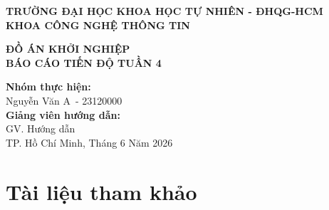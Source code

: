 \documentclass[12pt,a4paper]{article}
\newcommand{\weeknumber}{4}
\newcommand{\reporttitle}{BÁO CÁO TIẾN ĐỘ TUẦN \weeknumber}
\newcommand{\subject}{ĐỒ ÁN KHỞI NGHIỆP}
\newcommand{\studentname}{Nguyễn Văn A}
\newcommand{\studentid}{23120000}
\newcommand{\instructor}{GV. Hướng dẫn}
\begin{document}
\begin{titlepage}
    \begin{center}
        \large
        \textbf{TRƯỜNG ĐẠI HỌC KHOA HỌC TỰ NHIÊN - ĐHQG-HCM} \\
        \textbf{KHOA CÔNG NGHỆ THÔNG TIN} \\
        \vspace{1cm}
        \vspace{1.5cm}
        
        \Large
        \textcolor{primary}{\textbf{\subject}} \\
        \vspace{1cm}
        \huge
        \textcolor{primary}{\textbf{\reporttitle}} \\
        \vspace{1.5cm}
        
        \large
        \textbf{Nhóm thực hiện:} \\
        \studentname\ - \studentid \\
        \vspace{1cm}
        \textbf{Giảng viên hướng dẫn:} \\
        \instructor \\
        
        \vfill
        \large
        TP. Hồ Chí Minh, Tháng 6 Năm 2026
    \end{center}
\end{titlepage}

\newpage
\tableofcontents
\newpage




\section{Tài liệu tham khảo}


\end{document}

